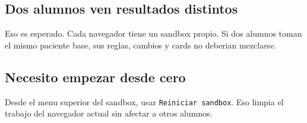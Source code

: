 \subsection{Dos alumnos ven resultados distintos}

Eso es esperado. Cada navegador tiene un sandbox propio. Si dos alumnos toman
el mismo paciente base, sus reglas, cambios y cards no deberian mezclarse.

\subsection{Necesito empezar desde cero}

Desde el menu superior del sandbox, usar \texttt{Reiniciar sandbox}. Eso limpia
el trabajo del navegador actual sin afectar a otros alumnos.
